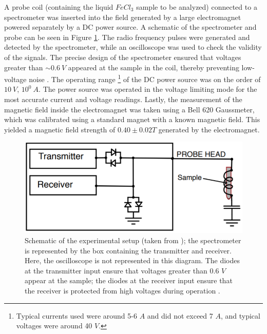 \documentclass[a4paper, 12pt]{article}  %
\begin{document}
 A probe coil (containing the liquid $FeCl_3$ sample to be analyzed) connected to a spectrometer was inserted into the field generated by a large electromagnet powered separately by a DC power source. A schematic of the spectrometer and probe can be seen in Figure \ref{fig:schematic}. The radio frequency pulses were generated and detected by the spectrometer, while an oscilloscope was used to check the validity of the signals. The precise design of the spectrometer ensured that voltages greater than $\sim 0.6 \ V$ appeared at the sample in the coil, thereby preventing low-voltage noise \cite{Lab Manual}. The operating range \footnote{Typical currents used were around 5-6 $A$ and did not exceed 7 $A$, and typical voltages were around 40 $V$.} of the DC power source was on the order of  $10 \ V$, $10^0 \ A$. The power source was operated in the voltage limiting mode for the most accurate current and voltage readings. Lastly, the measurement of the magnetic field inside the electromagnet was taken using a Bell 620 Gaussmeter, which was calibrated using a standard magnet with a known magnetic field. This yielded a magnetic field strength of $0.40 \pm 0.02 T$ generated by the electromagnet. 
 
 \begin{figure}[htb]
     \centering
     \includegraphics[scale=0.75]{schematic.PNG}
     \caption{Schematic of the experimental setup (taken from \cite{Lab Manual}); the spectrometer is represented by the box containing the transmitter and receiver. Here, the oscilloscope is not represented in this diagram. The diodes at the transmitter input ensure that voltages greater than 0.6 $V$ appear at the sample; the diodes at the receiver input ensure that the receiver is protected from high voltages during operation \cite{Lab Manual}.}
     \label{fig:schematic}
 \end{figure}

\end{document}
